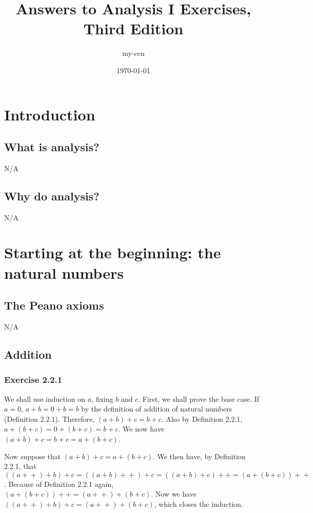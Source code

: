 \documentclass[12pt, oneside]{book}
\title{Answers to Analysis I Exercises, Third Edition}
\author{my-cen}
\date{\today}
\newcommand{\increment}{\! + \! +}
\begin{document}
	\maketitle
	\tableofcontents

	\chapter{Introduction}

	\section{What is analysis?}

	N/A

	\section{Why do analysis?}

	N/A

	\chapter{Starting at the beginning: the natural numbers}

	\section{The Peano axioms}

	N/A

	\section{Addition}

	\subsection*{Exercise 2.2.1}

	We shall use induction on $a$, fixing $b$ and $c$. First, we shall prove the base case. If $a = 0$, $a + b = 0 + b = b$ by the definition of addition of natural numbers  (Definition 2.2.1). Therefore, $(a + b) + c = b + c$. Also by Definition 2.2.1, $a + (b + c) = 0 + (b + c) = b + c$. We now have $(a + b) + c = b + c = a + (b + c)$.

	Now suppose that $(a + b) + c = a + (b + c)$. We then have, by Definition 2.2.1, that $((a\increment) + b) + c = ((a + b)\increment) + c = ((a + b) + c)\increment = (a + (b + c))\increment$. Because of Definition 2.2.1 again, $(a + (b + c))\increment = (a\increment) + (b + c)$. Now we have $((a\increment) + b) + c = (a\increment) + (b + c)$, which closes the induction.
\end{document}
